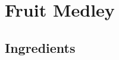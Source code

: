 \thispagestyle{fancy}
\section{Fruit Medley}
\AddToShipoutPicture*{\FruitMedley}

\subsection*{Ingredients}